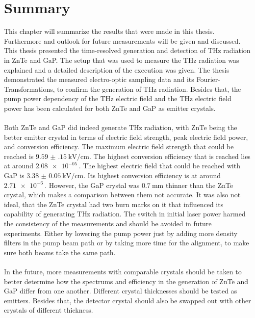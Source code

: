 \chapter{Summary}
This chapter will summarize the results that were made in this thesis.
Furthermore and outlook for future measurements will be given and discussed.
\\
This thesis presented the time-resolved generation and detection of $\si{\tera\hertz}$ radiation in ZnTe and GaP.
The setup that was used to measure the $\si{\tera\hertz}$ radiation was explained and a detailed description of the execution was given.
The thesis demonstrated the measured electro-optic sampling data and its Fourier-Transformations, to confirm the generation of $\si{\tera\hertz}$ radiation.
Besides that, the pump power dependency of the $\si{\tera\hertz}$ electric field and the $\si{\tera\hertz}$ electric field power has been calculated for both ZnTe and GaP as emitter crystals.
\\\\
Both ZnTe and GaP did indeed generate $\si{\tera\hertz}$ radiation, with ZnTe being the better emitter crystal in terms of electric field strength, peak electric field power, and conversion efficiency.
The maximum electric field strength that could be reached is $\SI{9.59(15)}{\kilo\V\per\centi\meter}$.
The highest conversion efficiency that is reached lies at around $\SI{2.08e-05}{}$.
The highest electric field that could be reached with GaP is $\SI{3.38(5)}{\kilo\V\per\centi\meter}$.
Its highest conversion efficiency is at around $\SI{2.71e-6}{}$.
However, the GaP crystal was $\SI{0.7}{\milli\meter}$ thinner than the ZnTe crystal, which makes a comparison between them not accurate.
It was also not ideal, that the ZnTe crystal had two burn marks on it that influenced its capability of generating $\si{\tera\hertz}$ radiation.
The switch in initial laser power harmed the consistency of the measurements and should be avoided in future experiments.
Either by lowering the pump power just by adding more density filters in the pump beam path or by taking more time for the alignment, to make sure both beams take the same path.
\\\\
In the future, more measurements with comparable crystals should be taken to better determine how the spectrums and efficiency in the generation of ZnTe and GaP differ from one another.
Different crystal thicknesses should be tested as emitters.
Besides that, the detector crystal should also be swapped out with other crystals of different thickness.
